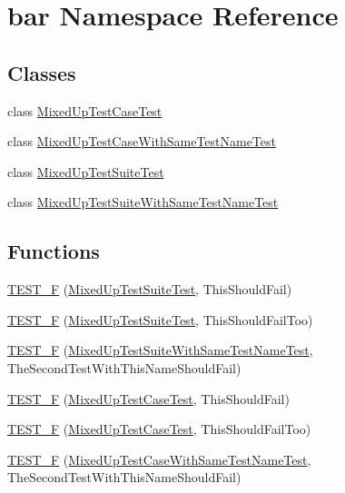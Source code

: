 \hypertarget{namespacebar}{}\section{bar Namespace Reference}
\label{namespacebar}
\subsection*{Classes}
\begin{DoxyCompactItemize}
\item 
class \mbox{\hyperlink{classbar_1_1_mixed_up_test_case_test}{Mixed\+Up\+Test\+Case\+Test}}
\item 
class \mbox{\hyperlink{classbar_1_1_mixed_up_test_case_with_same_test_name_test}{Mixed\+Up\+Test\+Case\+With\+Same\+Test\+Name\+Test}}
\item 
class \mbox{\hyperlink{classbar_1_1_mixed_up_test_suite_test}{Mixed\+Up\+Test\+Suite\+Test}}
\item 
class \mbox{\hyperlink{classbar_1_1_mixed_up_test_suite_with_same_test_name_test}{Mixed\+Up\+Test\+Suite\+With\+Same\+Test\+Name\+Test}}
\end{DoxyCompactItemize}
\subsection*{Functions}
\begin{DoxyCompactItemize}
\item 
\mbox{\hyperlink{namespacebar_a95397ed83e5072747d6333cbfae5ea0e}{T\+E\+S\+T\+\_\+F}} (\mbox{\hyperlink{classbar_1_1_mixed_up_test_suite_test}{Mixed\+Up\+Test\+Suite\+Test}}, This\+Should\+Fail)
\item 
\mbox{\hyperlink{namespacebar_ae02a29b454cf88337a77336c2bf1f0a4}{T\+E\+S\+T\+\_\+F}} (\mbox{\hyperlink{classbar_1_1_mixed_up_test_suite_test}{Mixed\+Up\+Test\+Suite\+Test}}, This\+Should\+Fail\+Too)
\item 
\mbox{\hyperlink{namespacebar_a23b15d10e91f920a5ed07ae9f27916df}{T\+E\+S\+T\+\_\+F}} (\mbox{\hyperlink{classbar_1_1_mixed_up_test_suite_with_same_test_name_test}{Mixed\+Up\+Test\+Suite\+With\+Same\+Test\+Name\+Test}}, The\+Second\+Test\+With\+This\+Name\+Should\+Fail)
\item 
\mbox{\hyperlink{namespacebar_a0e342ef00f400f593f866279689c55ac}{T\+E\+S\+T\+\_\+F}} (\mbox{\hyperlink{classbar_1_1_mixed_up_test_case_test}{Mixed\+Up\+Test\+Case\+Test}}, This\+Should\+Fail)
\item 
\mbox{\hyperlink{namespacebar_adf88eb6e7ed65a5bd641aa80b237ea2c}{T\+E\+S\+T\+\_\+F}} (\mbox{\hyperlink{classbar_1_1_mixed_up_test_case_test}{Mixed\+Up\+Test\+Case\+Test}}, This\+Should\+Fail\+Too)
\item 
\mbox{\hyperlink{namespacebar_a600f9a0c34015b598089fb6b69adc63a}{T\+E\+S\+T\+\_\+F}} (\mbox{\hyperlink{classbar_1_1_mixed_up_test_case_with_same_test_name_test}{Mixed\+Up\+Test\+Case\+With\+Same\+Test\+Name\+Test}}, The\+Second\+Test\+With\+This\+Name\+Should\+Fail)
\end{DoxyCompactItemize}


